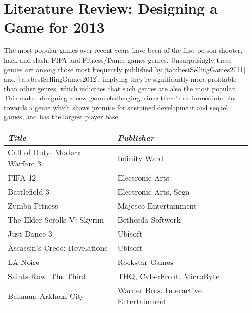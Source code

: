 
\section{Literature Review: Designing a Game for 2013}
\label{sec:litRevDesigningGame}

The most popular games over recent years have been of the first person shooter, hack and slash, FIFA and Fitness/Dance games genres. Unsurprisingly these genres are among those most frequently published by \ref{tab:bestSellingGames2011} and \ref{tab:bestSellingGames2012}, implying they're significantly more profitable than other genres, which indicates that such genres are also the most popular. This makes designing a new game challenging, since there's an immediate bias towards a genre which shows promise for sustained development and sequel games, and has the largest player base. 

\begin{table*}[!ht]
	\begin{tabular}{p{15em} p{13em}}
		\toprule
		\emph{Title} & \emph{Publisher}\\
		\midrule
	Call of Duty: Modern Warfare 3 & Infinity Ward
	\\
	FIFA 12 & Electronic Arts
	\\
	Battlefield 3 & Electronic Arts, Sega
	\\
	Zumba Fitness & Majesco Entertainment
	\\
	The Elder Scrolls V: Skyrim & Bethesda Softwork
	\\
	Just Dance 3 & Ubisoft
	\\
	Assassin's Creed: Revelations & Ubisoft
	\\
	LA Noire & Rockstar Games
	\\
	Saints Row: The Third & THQ, CyberFront, MicroByte
	\\
	Batman: Arkham City & Warner Bros. Interactive Entertainment 
	\\
	\bottomrule
	\end{tabular}
	\caption[Best selling games of 2011]{Best selling games of 2011.}
	\label{tab:bestSellingGames2011}
\end{table*}

